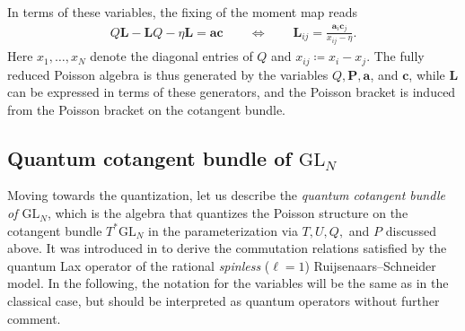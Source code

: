 In terms of these variables, the fixing of the moment map reads
\begin{align}
Q\mathbf{L}-\mathbf{L}Q - \eta \mathbf{L} = \mathbf{a} \mathbf{c} \qquad \Leftrightarrow \qquad \mathbf{L}_{ij} = \frac{\mathbf{a}_i \mathbf{c}_j}{x_{ij}-\eta}.
\end{align}
Here $x_1,\dots,x_N$ denote the diagonal entries of $Q$ and $x_{ij} \coloneq x_i - x_j$.
The fully reduced Poisson algebra is thus generated by the variables $Q,\mathbf{P},\mathbf{a}$, and $\mathbf{c}$, while $\mathbf{L}$ can be expressed in terms of these generators, and the Poisson bracket is induced from the Poisson bracket on the cotangent bundle.

\subsection{Quantum cotangent bundle of $\mathrm{GL}_N$} \label{subsection:quantumCotangentBundle}

Moving towards the quantization, let us describe the \emph{quantum cotangent bundle of $\mathrm{GL}_N$}, which is the algebra that quantizes the Poisson structure on the cotangent bundle $T^*\mathrm{GL}_N$ in the parameterization via $T,U,Q,$ and $P$ discussed above. It was introduced in \cite{arutyunov_quantum_1996} to derive the commutation relations satisfied by the quantum Lax operator of the rational \emph{spinless} ($\ell=1$) Ruijsenaars--Schneider model. In the following, the notation for the variables will be the same as in the classical case, but should be interpreted as quantum operators without further comment.


